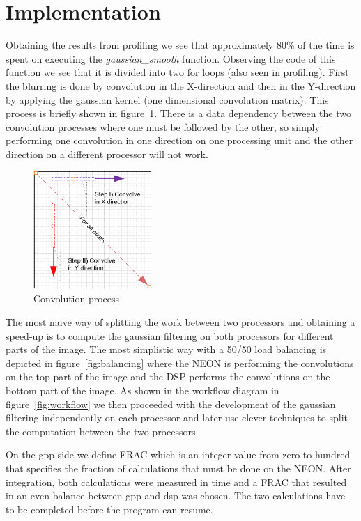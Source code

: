 \section{Implementation}
Obtaining the results from profiling we see that approximately 80\% of the time is spent on executing the \textit{gaussian\_smooth} function. Observing the code of this function we see that it is divided into two for loops (also seen in profiling).
First the blurring is done by convolution in the X-direction and then in the Y-direction by applying the gaussian kernel (one dimensional convolution matrix). This process is briefly shown in figure~\ref{fig:convolution}. There is a data dependency between the two convolution processes where one must be followed by the other, so simply performing one convolution in one direction on one processing unit and the other direction on a different processor will not work.

\begin{figure}
\centering
\includegraphics[width=0.4\textwidth]{drawings/gaussian_general}
\caption{Convolution process}
\label{fig:convolution}
\end{figure}

The most naive way of splitting the work between two processors and obtaining a speed-up is to compute the gaussian filtering on both processors for different parts of the image. The most simplistic way with a 50/50 load balancing is depicted in figure~\ref{fig:balancing} where the NEON is performing the convolutions on the top part of the image and the DSP performs the convolutions on the bottom part of the image. As shown in the workflow diagram in figure~\ref{fig:workflow} we then proceeded with the development of the gaussian filtering independently on each processor and later use clever techniques to split the computation between the two processors.

On the gpp side we define FRAC which is an integer value from zero to hundred that specifies the fraction of calculations that must be done on the NEON. After integration, both calculations were measured in time and a FRAC that resulted in an even balance between gpp and dsp was chosen. The two calculations have to be completed before the program can resume.

